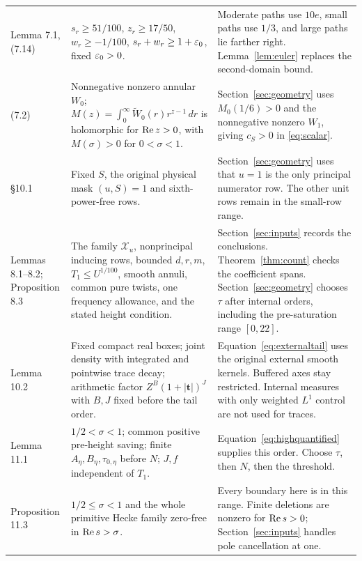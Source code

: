 \begin{longtable}{@{}>{\raggedright\arraybackslash}p{}>{\raggedright\arraybackslash}p{}>{\raggedright\arraybackslash}p{}@{}}
Lemma 7.1, (7.14)&$s_r\ge51/100$, $z_r\ge17/50$, $w_r\ge-1/100$, $s_r+w_r\ge1+\varepsilon_0$, fixed $\varepsilon_0>0$.&Moderate paths use $10e$, small paths use $1/3$, and large paths lie farther right. Lemma~\ref{lem:euler} replaces the second-domain bound.\\
(7.2)&Nonnegative nonzero annular $W_0$; $M(z)=\int_0^\infty\widetilde W_0(r)r^{z-1}\,dr$ is holomorphic for $\operatorname{Re} z>0$, with $M(\sigma)>0$ for $0<\sigma<1$.&Section~\ref{sec:geometry} uses $M_0(1/6)>0$ and the nonnegative nonzero $W_1$, giving $c_S>0$ in \eqref{eq:scalar}.\\
\S10.1&Fixed $S$, the original physical mask $(u,S)=1$ and sixth-power-free rows.&Section~\ref{sec:geometry} uses that $u=1$ is the only principal numerator row. The other unit rows remain in the small-row range.\\
Lemmas 8.1--8.2; Proposition 8.3&The family $\mathcal X_u$, nonprincipal inducing rows, bounded $d,r,m$, $T_1\le U^{1/100}$, smooth annuli, common pure twists, one frequency allowance, and the stated height condition.&Section~\ref{sec:inputs} records the conclusions. Theorem~\ref{thm:count} checks the coefficient spans. Section~\ref{sec:geometry} chooses $\tau$ after internal orders, including the pre-saturation range $[0,22]$.\\
Lemma 10.2&Fixed compact real boxes; joint density with integrated and pointwise trace decay; arithmetic factor $Z^B(1+|\boldsymbol t|)^J$ with $B,J$ fixed before the tail order.&Equation~\eqref{eq:externaltail} uses the original external smooth kernels. Buffered axes stay restricted. Internal measures with only weighted $L^1$ control are not used for traces.\\
Lemma 11.1&$1/2<\sigma<1$; common positive pre-height saving; finite $A_\eta,B_\eta,\tau_{0,\eta}$ before $N$; $J,f$ independent of $T_1$.&Equation~\eqref{eq:highquantified} supplies this order. Choose $\tau$, then $N$, then the threshold.\\
Proposition 11.3&$1/2\le\sigma<1$ and the whole primitive Hecke family zero-free in $\operatorname{Re} s>\sigma$.&Every boundary here is in this range. Finite deletions are nonzero for $\operatorname{Re} s>0$; Section~\ref{sec:inputs} handles pole cancellation at one.\\
\end{longtable}

